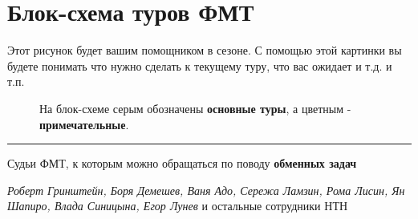 \documentclass[12pt]{article}
\begin{document}
\section*{Блок-схема туров ФМТ}
Этот рисунок будет вашим помощником в сезоне. С помощью этой картинки вы будете понимать что нужно сделать к текущему туру, что вас ожидает и т.д. и т.п.
\begin{figure}[h!]
	\caption{На блок-схеме серым обозначены \textbf{основные туры}, а цветным - \textbf{примечательные}.}
\end{figure}

\hrule
\vspace{6pt}
\noindent Судьи ФМТ, к которым можно обращаться по поводу {\bf обменных задач}
\begin{center}
	{\it Роберт Гринштейн, Боря Демешев, Ваня Адо, Сережа Ламзин, Рома Лисин, Ян Шапиро, Влада Синицына, Егор Лунев} и остальные сотрудники НТН
\end{center}
\end{document}
